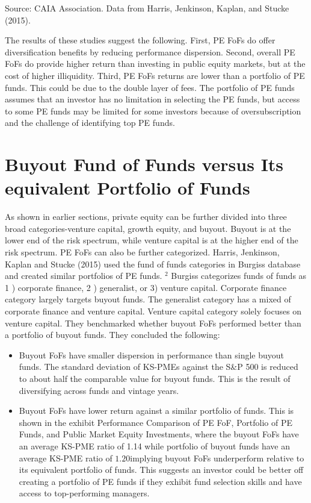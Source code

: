 \documentclass[11pt]{article}
\begin{document}
Source: CAIA Association. Data from Harris, Jenkinson, Kaplan, and Stucke (2015).

The results of these studies suggest the following. First, PE FoFs do offer diversification benefits by reducing performance dispersion. Second, overall PE FoFs do provide higher return than investing in public equity markets, but at the cost of higher illiquidity. Third, PE FoFs returns are lower than a portfolio of PE funds. This could be due to the double layer of fees. The portfolio of PE funds assumes that an investor has no limitation in selecting the PE funds, but access to some PE funds may be limited for some investors because of oversubscription and the challenge of identifying top PE funds.

\section*{Buyout Fund of Funds versus Its equivalent Portfolio of Funds}
As shown in earlier sections, private equity can be further divided into three broad categories-venture capital, growth equity, and buyout. Buyout is at the lower end of the risk spectrum, while venture capital is at the higher end of the risk spectrum. PE FoFs can also be further categorized. Harris, Jenkinson, Kaplan and Stucke (2015) used the fund of funds categories in Burgiss database and created similar portfolios of PE funds. ${ }^{2}$ Burgiss categorizes funds of funds as 1 ) corporate finance, 2 ) generalist, or 3) venture capital. Corporate finance category largely targets buyout funds. The generalist category has a mixed of corporate finance and venture capital. Venture capital category solely focuses on venture capital. They benchmarked whether buyout FoFs performed better than a portfolio of buyout funds. They concluded the following:

\begin{itemize}
  \item Buyout FoFs have smaller dispersion in performance than single buyout funds. The standard deviation of KS-PMEs against the S\&P 500 is reduced to about half the comparable value for buyout funds. This is the result of diversifying across funds and vintage years.
  \item Buyout FoFs have lower return against a similar portfolio of funds. This is shown in the exhibit Performance Comparison of PE FoF, Portfolio of PE Funds, and Public Market Equity Investments, where the buyout FoFs have an average KS-PME ratio of 1.14 while portfolio of buyout funds have an average KS-PME ratio of $1.20 \mathrm{implying}$ buyout FoFs underperform relative to its equivalent portfolio of funds. This suggests an investor could be better off creating a portfolio of PE funds if they exhibit fund selection skills and have access to top-performing managers.
\end{itemize}
\end{document}
